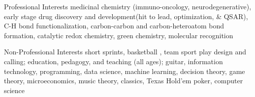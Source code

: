 

\begin{cvskills}
	
	\cvskill
	{Professional Interests} %
	{medicinal chemistry (immuno-oncology, neurodegenerative), early stage drug discovery and development\newline (hit to lead, optimization, \& QSAR), C-H bond functionalization, carbon-carbon and carbon-heteroatom bond\newline
		\vspace{-0.1em}
		formation, catalytic redox chemistry, green chemistry, molecular recognition} %
	
	\cvskill
	{Non-Professional Interests} %
	{short sprints, basketball%
		, team sport play design and calling; education, pedagogy, and teaching (all ages);\newline
		guitar, information technology, programming, data science, machine learning, decision theory, game theory,\newline
		\vspace{-0.1em}
		microeconomics, music theory, classics, Texas Hold’em poker, computer science} %
	
\end{cvskills}
